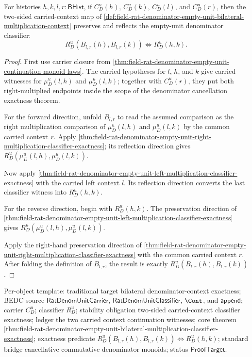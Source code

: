 \begin{theorem}
\label{thm:field-rat-denominator-empty-unit-bilateral-multiplication-classifier-exactness}
For histories $h,k,l,r:\mathsf{BHist}$, if $C_D^u(h)$, $C_D^u(k)$, $C_D^u(l)$,
and $C_D^u(r)$, then the two-sided carried-context map of
\autoref{def:field-rat-denominator-empty-unit-bilateral-multiplication-context}
preserves and reflects the empty-unit denominator classifier:
$$
R_D^u(B_{l,r}(h),B_{l,r}(k)) \Longleftrightarrow R_D^u(h,k).
$$
\end{theorem}
\begin{proof}
First use carrier closure from
\autoref{thm:field-rat-denominator-empty-unit-continuation-monoid-laws}. The
carried hypotheses for $l$, $h$, and $k$ give carried witnesses for
$\mu_D^u(l,h)$ and $\mu_D^u(l,k)$; together with $C_D^u(r)$, they put both
right-multiplied endpoints inside the scope of the denominator cancellation
exactness theorem.

For the forward direction, unfold $B_{l,r}$ to read the assumed comparison as
the right multiplication comparison of $\mu_D^u(l,h)$ and $\mu_D^u(l,k)$ by the
common carried context $r$. Apply
\autoref{thm:field-rat-denominator-empty-unit-right-multiplication-classifier-exactness};
its reflection direction gives
$R_D^u(\mu_D^u(l,h),\mu_D^u(l,k))$.

Now apply
\autoref{thm:field-rat-denominator-empty-unit-left-multiplication-classifier-exactness}
with the carried left context $l$. Its reflection direction converts the last
classifier witness into $R_D^u(h,k)$.

For the reverse direction, begin with $R_D^u(h,k)$. The preservation direction of
\autoref{thm:field-rat-denominator-empty-unit-left-multiplication-classifier-exactness}
gives $R_D^u(\mu_D^u(l,h),\mu_D^u(l,k))$.

Apply the right-hand preservation direction of
\autoref{thm:field-rat-denominator-empty-unit-right-multiplication-classifier-exactness}
with the common carried context $r$. After folding the definition of $B_{l,r}$,
the result is exactly $R_D^u(B_{l,r}(h),B_{l,r}(k))$.
\end{proof}

Per-object template: traditional target bilateral denominator-context exactness;
BEDC source $\mathsf{RatDenomUnitCarrier}$, $\mathsf{RatDenomUnitClassifier}$,
$\Cont$, and $\mathsf{append}$; carrier $C_D^u$; classifier $R_D^u$; stability
obligation two-sided carried-context classifier exactness; ledger the two carried
context continuation witnesses; core theorem
\autoref{thm:field-rat-denominator-empty-unit-bilateral-multiplication-classifier-exactness};
exactness predicate
$R_D^u(B_{l,r}(h),B_{l,r}(k)) \Longleftrightarrow R_D^u(h,k)$; standard bridge
cancellative commutative denominator monoids; status $\mathsf{ProofTarget}$.

